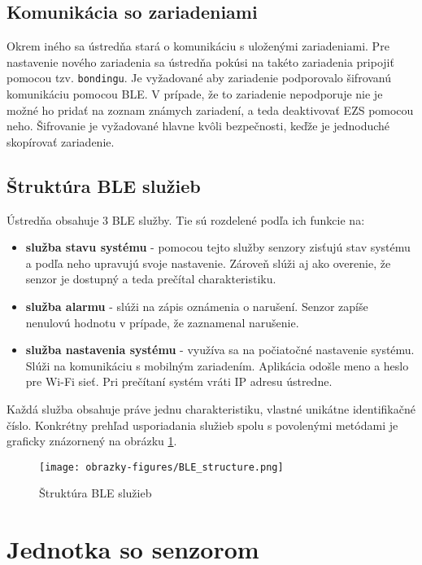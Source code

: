 \subsection{Komunikácia so zariadeniami}

Okrem iného sa ústredňa stará o komunikáciu s uloženými zariadeniami. Pre nastavenie nového zariadenia sa ústredňa pokúsi na takéto zariadenia pripojiť pomocou tzv. \texttt{bondingu}. Je vyžadované aby zariadenie podporovalo šifrovanú komunikáciu pomocou BLE. V prípade, že to zariadenie nepodporuje nie je možné ho pridať na zoznam známych zariadení, a teda deaktivovať EZS pomocou neho. Šifrovanie je vyžadované hlavne kvôli bezpečnosti, keďže je jednoduché skopírovať zariadenie.

\subsection{Štruktúra BLE služieb}\label{sec:BLE_struc}

Ústredňa obsahuje 3 BLE služby. Tie sú rozdelené podľa ich funkcie na:
\begin{itemize}
    \item \textbf{služba stavu systému} - pomocou tejto služby senzory zisťujú stav systému a podľa neho upravujú svoje nastavenie. Zároveň slúži aj ako overenie, že senzor je dostupný a teda prečítal charakteristiku.
    \item \textbf{služba alarmu} - slúži na zápis oznámenia o narušení. Senzor zapíše nenulovú hodnotu v prípade, že zaznamenal narušenie.
    \item \textbf{služba nastavenia systému} - využíva sa na počiatočné nastavenie systému. Slúži na komunikáciu s mobilným zariadením. Aplikácia odošle meno a heslo pre Wi-Fi sieť. Pri prečítaní systém vráti IP adresu ústredne.
\end{itemize}

Každá služba obsahuje práve jednu charakteristiku, vlastné unikátne identifikačné číslo. Konkrétny prehľad usporiadania služieb spolu s povolenými metódami je graficky znázornený na obrázku \ref{fig:BLE_structure}.

\begin{figure}[ht]
    \centering
    \texttt{[image: obrazky-figures/BLE\_structure.png]}
    \caption{Štruktúra BLE služieb}
    \label{fig:BLE_structure}
\end{figure}

\section{Jednotka so senzorom}

